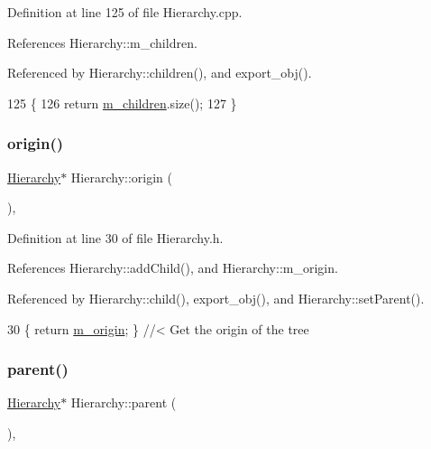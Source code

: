 Definition at line 125 of file Hierarchy.\+cpp.



References Hierarchy\+::m\+\_\+children.



Referenced by Hierarchy\+::children(), and export\+\_\+obj().


\begin{DoxyCode}
125                                            \{
126   \textcolor{keywordflow}{return} \hyperlink{classHierarchy_a038816763941fd4a930504917f60483b}{m\_children}.size();
127 \}
\end{DoxyCode}
\mbox{\label{classHierarchy_aee461dc930ce3871636ff87f075b1b83}} 
\subsubsection{\texorpdfstring{origin()}{origin()}}
{\footnotesize\ttfamily \hyperlink{classHierarchy}{Hierarchy}$\ast$ Hierarchy\+::origin (\begin{DoxyParamCaption}{ }\end{DoxyParamCaption})\hspace{0.3cm}{\ttfamily [inline]}, {\ttfamily [inherited]}}



Definition at line 30 of file Hierarchy.\+h.



References Hierarchy\+::add\+Child(), and Hierarchy\+::m\+\_\+origin.



Referenced by Hierarchy\+::child(), export\+\_\+obj(), and Hierarchy\+::set\+Parent().


\begin{DoxyCode}
30 \{ \textcolor{keywordflow}{return} \hyperlink{classHierarchy_a16c73e557d3a7c156ffb5dc4102d148e}{m\_origin}; \}  \textcolor{comment}{//< Get the origin of the tree}
\end{DoxyCode}
\mbox{\label{classHierarchy_a1c7bec8257e717f9c1465e06ebf845fc}} 
\subsubsection{\texorpdfstring{parent()}{parent()}\hspace{0.1cm}{\footnotesize\ttfamily [1/2]}}
{\footnotesize\ttfamily \hyperlink{classHierarchy}{Hierarchy}$\ast$ Hierarchy\+::parent (\begin{DoxyParamCaption}{ }\end{DoxyParamCaption})\hspace{0.3cm}{\ttfamily [inline]}, {\ttfamily [inherited]}}



